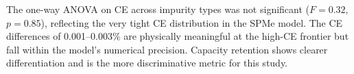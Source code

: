 The one-way ANOVA on CE across impurity types was not significant ($F=0.32$, $p=0.85$), reflecting the very tight CE distribution in the SPMe model. The CE differences of 0.001--0.003\% are physically meaningful at the high-CE frontier but fall within the model's numerical precision. Capacity retention shows clearer differentiation and is the more discriminative metric for this study.

